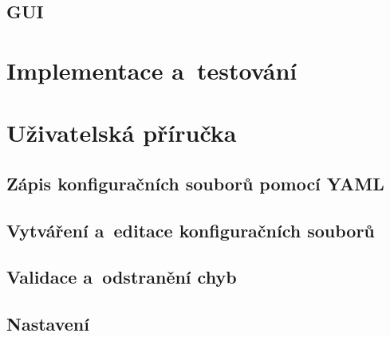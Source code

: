 \documentclass[FM,bw,DP]{tulthesis}
\begin{document}
\section{GUI}


\chapter{Implementace a~testování}






\chapter{Uživatelská příručka}

\section{Zápis konfiguračních souborů pomocí YAML}

\section{Vytváření a~editace konfiguračních souborů}

\section{Validace a~odstranění chyb}

\section{Nastavení} 

\end{document}
